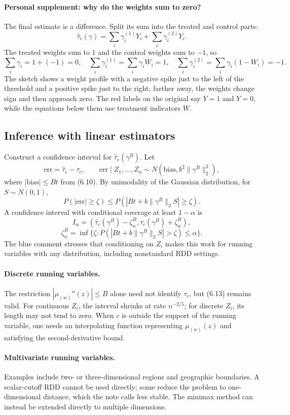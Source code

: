 \paragraph{Personal supplement: why do the weights sum to zero?}
The final estimate is a difference. Split its sum into the treated and control parts:
\[
\widehat\tau_c(\gamma)=\sum_i\gamma_i^{(1)}Y_i+\sum_i\gamma_i^{(2)}Y_i.
\]
The treated weights sum to $1$ and the control weights sum to $-1$, so
\[
\sum_i\gamma_i=1+(-1)=0,\quad
\sum_i\gamma_i^{(1)}=\sum_i\gamma_iW_i=1,\quad
\sum_i\gamma_i^{(2)}=\sum_i\gamma_i(1-W_i)=-1.
\]
The sketch shows a weight profile with a negative spike just to the left of the threshold and a positive spike just to the right; farther away, the weights change sign and then approach zero. The red labels on the original say $Y=1$ and $Y=0$, while the equations below them use treatment indicators $W$.
\subsection{Inference with linear estimators}
Construct a confidence interval for $\widehat\tau_c(\gamma^B)$. Let
\[
\mathrm{err}=\widehat\tau_c-\tau_c,\qquad
\mathrm{err}\mid Z_1,\ldots,Z_n\sim N(\mathrm{bias},b^2\|\gamma^B\|_2^2),
\]
where $|\mathrm{bias}|\leq Bt$ from (6.10). By unimodality of the Gaussian distribution, for $S\sim N(0,1)$,
\[
P(|\mathrm{err}|\geq\zeta)\leq P(|Bt+b\|\gamma^B\|_2S|\geq\zeta).
\]
A confidence interval with conditional coverage at least $1-\alpha$ is
\[
I_\alpha=(\widehat\tau_c(\gamma^B)-\zeta_\alpha^B,
\widehat\tau_c(\gamma^B)+\zeta_\alpha^B),
\]
\[
\zeta_\alpha^B=\inf\{\zeta:P(|Bt+b\|\gamma^B\|_2S|>\zeta)\leq\alpha\}.
\tag{6.13 in the notes}
\]
The blue comment stresses that conditioning on $Z_i$ makes this work for running variables with any distribution, including nonstandard RDD settings.
\paragraph{Discrete running variables.}
The restriction $|\mu_{(w)}''(z)|\leq B$ alone need not identify $\tau_c$, but (6.13) remains valid. For continuous $Z_i$, the interval shrinks at rate $n^{-2/5}$; for discrete $Z_i$, its length may not tend to zero. When $c$ is outside the support of the running variable, one needs an interpolating function representing $\mu_{(w)}(z)$ and satisfying the second-derivative bound.
\paragraph{Multivariate running variables.}
Examples include two- or three-dimensional regions and geographic boundaries. A scalar-cutoff RDD cannot be used directly; some reduce the problem to one-dimensional distance, which the note calls less stable. The minimax method can instead be extended directly to multiple dimensions.
